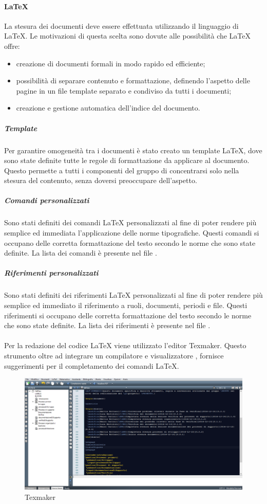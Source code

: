  \paragraph{\LaTeX{}}
La stesura dei documenti deve essere effettuata utilizzando il linguaggio di  \LaTeX{}. Le motivazioni di questa scelta sono dovute alle possibilità che \LaTeX{}{} offre:
\begin{itemize}
	\item creazione di documenti formali in modo rapido ed efficiente;
	\item possibilità di separare contenuto e formattazione, definendo l'aspetto delle pagine in un file
template separato e condiviso da tutti i documenti;
	\item creazione e gestione automatica dell'indice del documento.
\end{itemize}
\subparagraph{Template}
Per garantire omogeneità tra i documenti è stato creato un template \LaTeX{}, dove sono state definite tutte le regole di formattazione da applicare al documento. Questo permette a tutti i componenti del gruppo di concentrarsi solo nella stesura del contenuto, senza doversi preoccupare dell'aspetto.
\subparagraph{Comandi personalizzati}
Sono stati definiti dei comandi \LaTeX{} personalizzati al fine di poter rendere più semplice ed immediata
l’applicazione delle norme tipografiche. Questi comandi si occupano delle
corretta formattazione del testo secondo le norme che sono state definite. La
lista dei comandi è presente nel file .
\subparagraph{Riferimenti personalizzati}
Sono stati definiti dei riferimenti \LaTeX{} personalizzati al fine di poter rendere più semplice ed immediato
il riferimento a ruoli, documenti, periodi e file. Questi riferimenti si occupano delle
corretta formattazione del testo secondo le norme che sono state definite. La
lista dei riferimenti è presente nel file .
 \paragraph{}
Per la redazione del codice \LaTeX{} viene utilizzato l'editor Texmaker. Questo
strumento oltre ad integrare un compilatore e visualizzatore , fornisce suggerimenti per il completamento dei comandi \LaTeX{}.
\begin{figure}[h]
\centering

\includegraphics[scale=0.4]{img/texm.png}
\caption{Texmaker}\label{sec:Figura3}
\end{figure}

